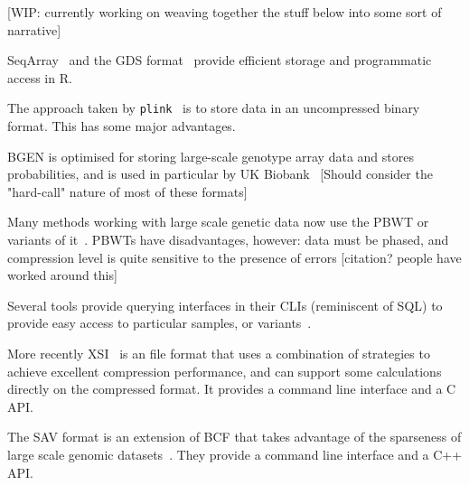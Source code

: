 \documentclass[a4paper,num-refs]{oup-contemporary}
\newcommand{\toolname}[1]{\texttt{#1}}
\begin{document}
[WIP: currently working on weaving together the stuff below into
some sort of narrative]


SeqArray~\citep{zheng2017seqarray} and the GDS format~\citep{zheng2012high}
provide efficient storage and programmatic access in R.


The approach taken by \toolname{plink}~\citep{purcell2007plink,chang2015second} is to
store data in an uncompressed binary format. This has some major
advantages.

BGEN \citep{band2018bgen} is optimised for storing large-scale
genotype array data and stores probabilities, and is used
in particular by UK Biobank~\citep{bycroft2018genome}
[Should consider the "hard-call" nature of most of these formats]

Many methods working with large scale genetic
data now use the PBWT or variants of
it~\citep[e.g.][]{li2016bgt,lefaive2021sparse,wertenbroek2022xsi}. PBWTs have
disadvantages, however: data must be phased, and compression level
is quite sensitive to the presence of errors [citation? people have
worked around this]

Several tools provide querying interfaces in their CLIs
(reminiscent of SQL) to provide easy access to particular samples, or
variants~\cite{li2016bgt,layer2016efficient}.

More recently XSI~\citep{wertenbroek2022xsi} is an file format that
uses a combination of strategies to achieve excellent compression
performance, and can support some calculations directly on the
compressed format. It provides a command line interface and a
C API.

The SAV format is an extension of BCF that takes advantage
of the sparseness of large scale genomic datasets~\citep{lefaive2021sparse}.
They provide a command line interface and a C++ API.

\end{document}
